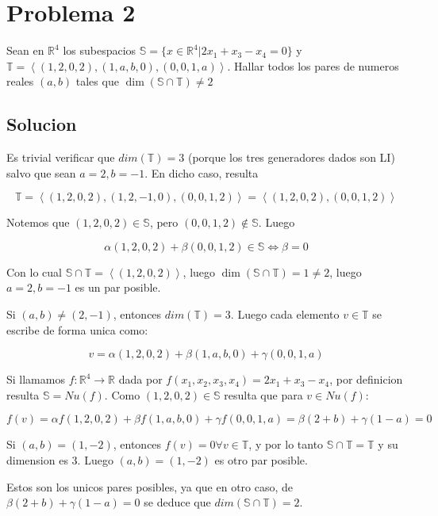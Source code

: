 \documentclass{article}
\begin{document}
\section{Problema 2}

Sean en $\mathbb{R}^4$ los subespacios $\mathbb{S} = \{ x\in \mathbb{R}^4 | 2x_1 + x_3 - x_4 = 0 \}$ y
$\mathbb{T} = \left \langle (1,2,0,2), (1,a,b,0), (0,0,1,a) \right \rangle$. Hallar todos los pares de numeros
reales $(a,b)$ tales que $\dim(\mathbb{S} \cap \mathbb{T}) \neq 2$

\subsection{Solucion}

Es trivial verificar que $dim(\mathbb{T}) = 3$ (porque los tres generadores dados son LI) salvo que sean $a=2, b=-1$. En dicho caso, resulta

$$\mathbb{T} = \left \langle (1,2,0,2), (1,2,-1,0), (0,0,1,2) \right \rangle = \left \langle (1,2,0,2), (0,0,1,2) \right \rangle$$

Notemos que $(1,2,0,2) \in \mathbb{S}$, pero $(0,0,1,2) \notin \mathbb{S}$. Luego 

$$\alpha (1,2,0,2) + \beta (0,0,1,2) \in \mathbb{S} \Leftrightarrow \beta = 0$$

Con lo cual $\mathbb{S} \cap \mathbb{T} = \left \langle (1,2,0,2) \right \rangle$, luego $\dim(\mathbb{S} \cap \mathbb{T}) = 1 \neq 2$,
luego $a = 2, b = -1$ es un par posible.

Si $(a,b) \neq (2,-1)$, entonces $dim(\mathbb{T}) = 3$. Luego cada elemento $v \in \mathbb{T}$ se escribe de forma unica como:

$$v = \alpha (1,2,0,2) + \beta (1,a,b,0) + \gamma (0,0,1,a) $$

Si llamamos $f : \mathbb{R}^4 \rightarrow \mathbb{R}$ dada por $f(x_1,x_2,x_3,x_4) = 2x_1 + x_3 - x_4$, por definicion resulta
$\mathbb{S} = Nu(f)$. Como $(1,2,0,2) \in \mathbb{S}$ resulta que para $v \in Nu(f)$:

$$f(v) = \alpha f(1,2,0,2) + \beta f(1,a,b,0) + \gamma f(0,0,1,a) = \beta (2+b) + \gamma (1-a) = 0$$

Si $(a,b) = (1,-2)$, entonces $f(v) = 0 \forall v \in \mathbb{T}$, y por lo tanto $\mathbb{S} \cap \mathbb{T} = \mathbb{T}$ y su dimension es 3.
Luego $(a,b) = (1,-2)$ es otro par posible.

Estos son los unicos pares posibles, ya que en otro caso, de $\beta (2+b) + \gamma (1-a) = 0$ se deduce que $dim(\mathbb{S} \cap \mathbb{T}) = 2$.
\end{document}
